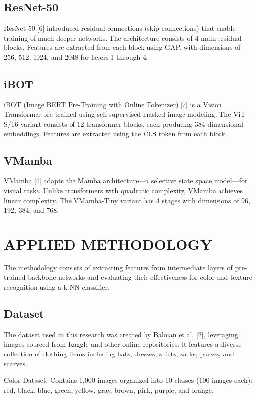 \documentclass[conference]{IEEEtran}
\begin{document}
\subsection{ResNet-50}
ResNet-50 [6] introduced residual connections (skip connections) that enable training of much deeper networks. The architecture consists of 4 main residual blocks. Features are extracted from each block using GAP, with dimensions of 256, 512, 1024, and 2048 for layers 1 through 4.

\subsection{iBOT}
iBOT (Image BERT Pre-Training with Online Tokenizer) [7] is a Vision Transformer pre-trained using self-supervised masked image modeling. The ViT-S/16 variant consists of 12 transformer blocks, each producing 384-dimensional embeddings. Features are extracted using the CLS token from each block.

\subsection{VMamba}
VMamba [4] adapts the Mamba architecture—a selective state space model—for visual tasks. Unlike transformers with quadratic complexity, VMamba achieves linear complexity. The VMamba-Tiny variant has 4 stages with dimensions of 96, 192, 384, and 768.


\section{APPLIED METHODOLOGY}

The methodology consists of extracting features from intermediate layers of pre-trained backbone networks and evaluating their effectiveness for color and texture recognition using a k-NN classifier.

\subsection{Dataset}
The dataset used in this research was created by Baloian et al. [2], leveraging images sourced from Kaggle and other online repositories. It features a diverse collection of clothing items including hats, dresses, shirts, socks, purses, and scarves.

Color Dataset: Contains 1,000 images organized into 10 classes (100 images each): red, black, blue, green, yellow, gray, brown, pink, purple, and orange.
\end{document}
